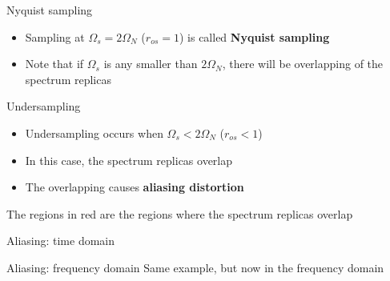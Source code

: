 \documentclass[10pt]{beamer}
\begin{document}
\begin{frame}{Nyquist sampling}
\begin{itemize}
	\item Sampling at $\Omega_s = 2\Omega_N$ ($r_{os} = 1$) is called \textbf{Nyquist sampling}
	\item Note that if $\Omega_s$ is any smaller than $2\Omega_N$, there will be overlapping of the spectrum replicas
	
\begin{center}
\end{center}
\end{itemize}
\end{frame}


\begin{frame}{Undersampling}
\begin{itemize}
	\item Undersampling occurs when $\Omega_s < 2\Omega_N$ ($r_{os} < 1$)
	\item In this case, the spectrum replicas overlap
	\item The overlapping causes \textbf{aliasing distortion}
\end{itemize}

\begin{center}
	\resizebox{0.9\linewidth}{!}{}
\end{center}
The regions in red are the regions where the spectrum replicas overlap
\end{frame}

\begin{frame}{Aliasing: time domain}
\begin{center}
	\resizebox{0.7\linewidth}{!}{}
\end{center}
\end{frame}

\begin{frame}{Aliasing: frequency domain}
Same example, but now in the frequency domain
\begin{center}
	\resizebox{0.9\linewidth}{!}{}
\end{center}


\end{frame}
\end{document}
